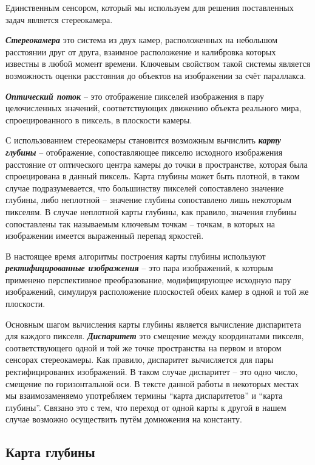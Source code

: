 \documentclass[aps,%
14pt,%
final,%
oneside,
onecolumn,%
musixtex, %
superscriptaddress,%
centertags]{extarticle} %
\begin{document}
Единственным сенсором, который мы используем для решения поставленных задач является стереокамера.

\textbf{\textit{Стереокамера}} это система из двух камер, расположенных на небольшом расстоянии друг от друга, взаимное расположение и калибровка которых известны в любой момент времени. Ключевым свойством такой системы является возможность оценки расстояния до объектов на изображении за счёт параллакса.

\textbf{\textit{Оптический поток}} -- это отображение пикселей изображения в пару целочисленных значений, соответствующих движению объекта реального мира, спроецированного в пиксель, в плоскости камеры.

С использованием стереокамеры становится возможным вычислить \textbf{\textit{карту глубины}} -- отображение, сопоставляющее пикселю исходного изображения расстояние от оптического центра камеры до точки в пространстве, которая была спроецирована в данный пиксель. Карта глубины может быть плотной, в таком случае подразумевается, что большинству пикселей сопоставлено значение глубины, либо неплотной -- значение глубины сопоставлено лишь некоторым пикселям. В случае неплотной карты глубины, как правило, значения глубины сопоставлены так называемым ключевым точкам -- точкам, в которых на изображении имеется выраженный перепад яркостей.

В настоящее время алгоритмы построения карты глубины используют \textbf{\textit{ректифицированные изображения}} -- это пара изображений, к которым применено перспективное преобразование, модифицирующее исходную пару изображений, симулируя расположение плоскостей обеих камер в одной и той же плоскости.

Основным шагом вычисления карты глубины является вычисление диспаритета для каждого пикселя. \textbf{\textit{Диспаритет}} это смещение между координатами пикселя, соответствующего одной и той же точке пространства на первом и втором сенсорах стереокамеры. Как правило, диспаритет вычисляется для пары ректифицированнх изображений. В таком случае диспаритет -- это одно число, смещение по горизонтальной оси. В тексте данной работы в некоторых местах мы взаимозаменяемо употребляем термины ``карта диспаритетов'' и ``карта глубины''. Связано это с тем, что переход от одной карты к другой в нашем случае возможно осуществить путём домножения на константу.

\subsection{Карта глубины}
\end{document}
